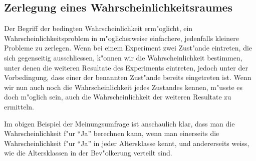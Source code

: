 \subsection{Zerlegung eines Wahrscheinlichkeitsraumes}
Der
Begriff der bedingten Wahrscheinlichkeit erm"oglicht,
ein Wahrscheinlichkeitsproblem in m"oglicherweise einfachere, jedenfalls
kleinere Probleme zu zerlegen. Wenn bei einem Experiment zwei Zust"ande
eintreten, die sich gegenseitig ausschliessen, k"onnen wir die 
Wahrscheinlichkeit bestimmen, unter denen die weiteren Resultate
des Experiments eintreten, jedoch unter der Vorbedingung, dass einer
der benannten Zust"ande bereits eingetreten ist. Wenn wir nun auch
noch die Wahrscheinlichkeit jedes Zustandes kennen, m"usste es doch
m"oglich sein, auch die Wahrscheinlichkeit der weiteren Resultate zu
ermitteln.

Im obigen Beispiel der Meinungsumfrage ist anschaulich klar, dass man die
Wahrscheinlichkeit f"ur ``Ja'' berechnen kann, wenn man einerseits die
Wahrscheinlichkeit f"ur ``Ja'' in  jeder Altersklasse kennt, und andererseits
weiss, wie die Altersklassen in der Bev"olkerung verteilt sind.

